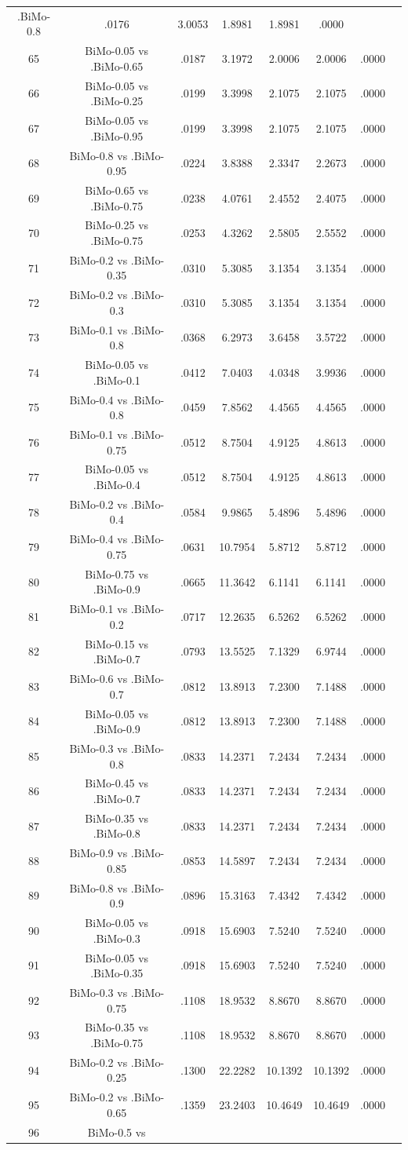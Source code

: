 \documentclass[a4paper,10pt]{article}
\begin{document}
\begin{landscape}
\begin{table}[!htp]
\begin{tabular}{cccccccc}
.BiMo-0.8&.0176&3.0053&1.8981&1.8981&.0000\\65&BiMo-0.05 vs .BiMo-0.65&.0187&3.1972&2.0006&2.0006&.0000\\66&BiMo-0.05 vs .BiMo-0.25&.0199&3.3998&2.1075&2.1075&.0000\\67&BiMo-0.05 vs .BiMo-0.95&.0199&3.3998&2.1075&2.1075&.0000\\68&BiMo-0.8 vs .BiMo-0.95&.0224&3.8388&2.3347&2.2673&.0000\\69&BiMo-0.65 vs .BiMo-0.75&.0238&4.0761&2.4552&2.4075&.0000\\70&BiMo-0.25 vs .BiMo-0.75&.0253&4.3262&2.5805&2.5552&.0000\\71&BiMo-0.2 vs .BiMo-0.35&.0310&5.3085&3.1354&3.1354&.0000\\72&BiMo-0.2 vs .BiMo-0.3&.0310&5.3085&3.1354&3.1354&.0000\\73&BiMo-0.1 vs .BiMo-0.8&.0368&6.2973&3.6458&3.5722&.0000\\74&BiMo-0.05 vs .BiMo-0.1&.0412&7.0403&4.0348&3.9936&.0000\\75&BiMo-0.4 vs .BiMo-0.8&.0459&7.8562&4.4565&4.4565&.0000\\76&BiMo-0.1 vs .BiMo-0.75&.0512&8.7504&4.9125&4.8613&.0000\\77&BiMo-0.05 vs .BiMo-0.4&.0512&8.7504&4.9125&4.8613&.0000\\78&BiMo-0.2 vs .BiMo-0.4&.0584&9.9865&5.4896&5.4896&.0000\\79&BiMo-0.4 vs .BiMo-0.75&.0631&10.7954&5.8712&5.8712&.0000\\80&BiMo-0.75 vs .BiMo-0.9&.0665&11.3642&6.1141&6.1141&.0000\\81&BiMo-0.1 vs .BiMo-0.2&.0717&12.2635&6.5262&6.5262&.0000\\82&BiMo-0.15 vs .BiMo-0.7&.0793&13.5525&7.1329&6.9744&.0000\\83&BiMo-0.6 vs .BiMo-0.7&.0812&13.8913&7.2300&7.1488&.0000\\84&BiMo-0.05 vs .BiMo-0.9&.0812&13.8913&7.2300&7.1488&.0000\\85&BiMo-0.3 vs .BiMo-0.8&.0833&14.2371&7.2434&7.2434&.0000\\86&BiMo-0.45 vs .BiMo-0.7&.0833&14.2371&7.2434&7.2434&.0000\\87&BiMo-0.35 vs .BiMo-0.8&.0833&14.2371&7.2434&7.2434&.0000\\88&BiMo-0.9 vs .BiMo-0.85&.0853&14.5897&7.2434&7.2434&.0000\\89&BiMo-0.8 vs .BiMo-0.9&.0896&15.3163&7.4342&7.4342&.0000\\90&BiMo-0.05 vs .BiMo-0.3&.0918&15.6903&7.5240&7.5240&.0000\\91&BiMo-0.05 vs .BiMo-0.35&.0918&15.6903&7.5240&7.5240&.0000\\92&BiMo-0.3 vs .BiMo-0.75&.1108&18.9532&8.8670&8.8670&.0000\\93&BiMo-0.35 vs .BiMo-0.75&.1108&18.9532&8.8670&8.8670&.0000\\94&BiMo-0.2 vs .BiMo-0.25&.1300&22.2282&10.1392&10.1392&.0000\\95&BiMo-0.2 vs .BiMo-0.65&.1359&23.2403&10.4649&10.4649&.0000\\96&BiMo-0.5 vs 
\end{tabular}
\end{table}
\end{landscape}
\end{document}

